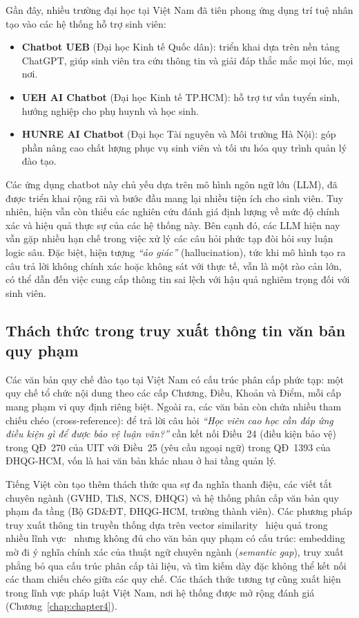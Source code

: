 Gần đây, nhiều trường đại học tại Việt Nam đã tiên phong ứng dụng trí tuệ nhân tạo vào các hệ thống hỗ trợ sinh viên:
\begin{itemize}
    \item \textbf{Chatbot UEB} (Đại học Kinh tế Quốc dân): triển khai dựa trên nền tảng ChatGPT, giúp sinh viên tra cứu thông tin và giải đáp thắc mắc mọi lúc, mọi nơi.
    \item \textbf{UEH AI Chatbot} (Đại học Kinh tế TP.HCM): hỗ trợ tư vấn tuyển sinh, hướng nghiệp cho phụ huynh và học sinh.
    \item \textbf{HUNRE AI Chatbot} (Đại học Tài nguyên và Môi trường Hà Nội): góp phần nâng cao chất lượng phục vụ sinh viên và tối ưu hóa quy trình quản lý đào tạo.
\end{itemize}

Các ứng dụng chatbot này chủ yếu dựa trên mô hình ngôn ngữ lớn (LLM), đã được triển khai rộng rãi và bước đầu mang lại nhiều tiện ích cho sinh viên. Tuy nhiên, hiện vẫn còn thiếu các nghiên cứu đánh giá định lượng về mức độ chính xác và hiệu quả thực sự của các hệ thống này. Bên cạnh đó, các LLM hiện nay vẫn gặp nhiều hạn chế trong việc xử lý các câu hỏi phức tạp đòi hỏi suy luận logic sâu. Đặc biệt, hiện tượng \textit{``ảo giác''} (hallucination), tức khi mô hình tạo ra câu trả lời không chính xác hoặc không sát với thực tế, vẫn là một rào cản lớn, có thể dẫn đến việc cung cấp thông tin sai lệch với hậu quả nghiêm trọng đối với sinh viên.

\subsection{Thách thức trong truy xuất thông tin văn bản quy phạm}
\label{subsec:thachchuc}

Các văn bản quy chế đào tạo tại Việt Nam có cấu trúc phân cấp phức tạp: một quy chế tổ chức nội dung theo các cấp Chương, Điều, Khoản và Điểm, mỗi cấp mang phạm vi quy định riêng biệt. Ngoài ra, các văn bản còn chứa nhiều tham chiếu chéo (cross-reference): để trả lời câu hỏi \textit{``Học viên cao học cần đáp ứng điều kiện gì để được bảo vệ luận văn?''} cần kết nối Điều~24 (điều kiện bảo vệ) trong QĐ~270 của UIT với Điều~25 (yêu cầu ngoại ngữ) trong QĐ~1393 của ĐHQG-HCM, vốn là hai văn bản khác nhau ở hai tầng quản lý.

Tiếng Việt còn tạo thêm thách thức qua sự đa nghĩa thanh điệu, các viết tắt chuyên ngành (GVHD, ThS, NCS, ĐHQG) và hệ thống phân cấp văn bản quy phạm đa tầng (Bộ GD\&ĐT, ĐHQG-HCM, trường thành viên). Các phương pháp truy xuất thông tin truyền thống dựa trên vector similarity~\cite{reimers2019sbert} hiệu quả trong nhiều lĩnh vực~\cite{fan2024ragsurvey} nhưng không đủ cho văn bản quy phạm có cấu trúc: embedding mờ đi ý nghĩa chính xác của thuật ngữ chuyên ngành (\textit{semantic gap}), truy xuất phẳng bỏ qua cấu trúc phân cấp tài liệu, và tìm kiếm dày đặc không thể kết nối các tham chiếu chéo giữa các quy chế. Các thách thức tương tự cũng xuất hiện trong lĩnh vực pháp luật Việt Nam, nơi hệ thống được mở rộng đánh giá (Chương~\ref{chap:chapter4}).

